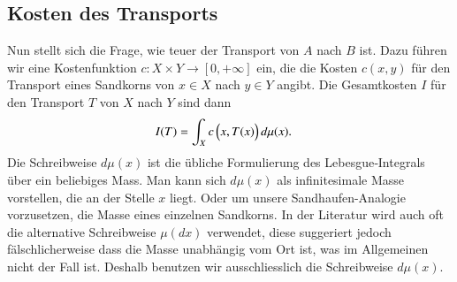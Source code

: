 \subsection{Kosten des Transports\label{mongekant:subsection:transport_cost}}
Nun stellt sich die Frage,
wie \glqq teuer\grqq{} der Transport von $A$ nach $B$ ist.
Dazu führen wir eine Kostenfunktion $c : X \times Y \to [0, +\infty]$ ein,
die die Kosten $c(x,y)$ für den Transport eines Sandkorns
von $x \in X$ nach $y \in Y$ angibt.
Die Gesamtkosten $I$ für den Transport $T$ von $X$ nach $Y$ sind dann
\begin{align}
I(T)
&=
\int_X c\,\Bigl(x, T(x)\Bigr) \, d\mu(x)
\label{mongekant:eq:monge_transport_cost}
.
\end{align}
Die Schreibweise $d\mu(x)$ ist die übliche Formulierung des
Lebesgue‑Integrals über ein beliebiges Mass.
Man kann sich $d\mu(x)$ als \glqq infinitesimale Masse\grqq{} vorstellen,
die an der Stelle $x$ liegt.
Oder um unsere Sandhaufen-Analogie vorzusetzen,
die Masse eines einzelnen Sandkorns.
In der Literatur wird auch oft die alternative Schreibweise $\mu(dx)$ verwendet,
diese suggeriert jedoch fälschlicherweise dass die Masse unabhängig vom Ort ist,
was im Allgemeinen nicht der Fall ist.
Deshalb benutzen wir ausschliesslich die Schreibweise $d\mu(x)$.
